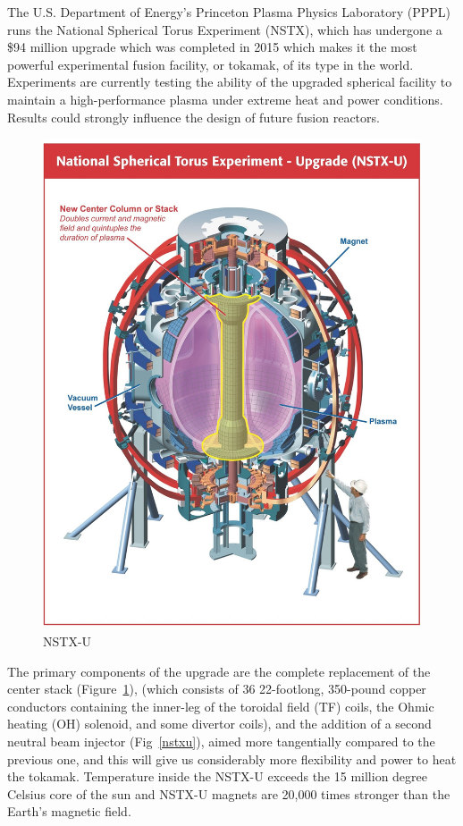\documentclass[12pt,lot, lof]{puthesis}
\begin{document}
The U.S. Department of Energy's Princeton Plasma Physics Laboratory (PPPL) runs the National Spherical Torus Experiment (NSTX), which has undergone a \$94 million upgrade which was completed in 2015 which makes it the most powerful experimental fusion facility, or tokamak, of its type in the world. Experiments are currently testing the ability of the upgraded spherical facility to maintain a high-performance plasma under extreme heat and power conditions. Results could strongly influence the design of future fusion reactors.

\begin{figure}
\centering
\includegraphics[width= 0.85\linewidth]{nstx3}
\caption{NSTX-U}
\label{nstx3}
\end{figure}

The primary components of the upgrade are the complete replacement of the center stack (Figure~\ref{nstx3}), (which consists of 36 22-footlong, 350-pound copper conductors containing the inner-leg of the toroidal field (TF) coils, the Ohmic heating (OH) solenoid, and some divertor coils), and the addition of a second neutral beam injector (Fig~\ref{nstxu}), aimed more tangentially compared to the previous one, and this will give us considerably more flexibility and power to heat the tokamak.
Temperature inside the NSTX-U exceeds the 15 million degree Celsius core of the sun and NSTX-U magnets are 20,000 times stronger than the Earth's magnetic field.
\end{document}
